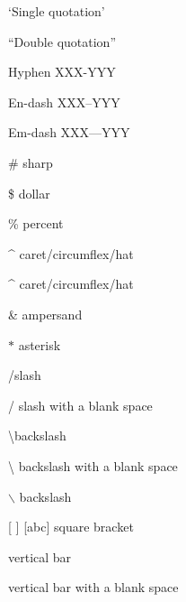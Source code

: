 \documentclass[12pt]{article}
\begin{document}
`Single quotation'

``Double quotation''

Hyphen XXX-YYY

En-dash XXX--YYY

Em-dash XXX---YYY

\# sharp

\$ dollar

\% percent

\textasciicircum{} caret/circumflex/hat

\string^ caret/circumflex/hat

\& ampersand

$\ast$ asterisk

\slash slash

\slash{} slash with a blank space

\textbackslash backslash

\textbackslash{} backslash with a blank space

$\backslash$ backslash

{[} {]} {[abc]} square bracket

\textbar vertical bar

\textbar{} vertical bar with a blank space
\end{document}
